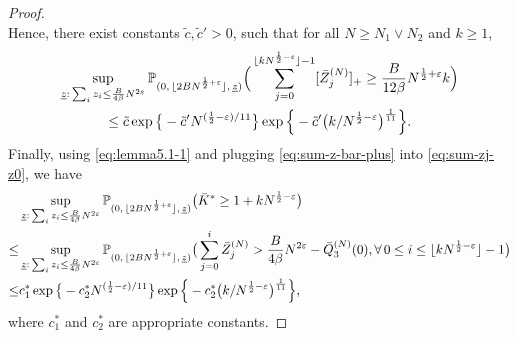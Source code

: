 \documentclass[10pt,a4paper]{amsart}
\begin{document}
\begin{proof}
$$$$
Hence, there exist constants $\tilde{c}, \tilde{c}'>0$, such that for all $N\geq N_1\vee N_2$ and $k\geq 1$,
\begin{multline}\label{eq:sum-z-bar-plus}
    \sup_{\underline{z}: \, \sum_iz_i \leq \frac{B}{4\beta}N^{2\varepsilon}}\mathbb{P}_{(0, \, \lfloor 2BN^{\frac{1}{2}+\varepsilon} \rfloor, \,\underline{z})}\Big(\sum_{j=0}^{\lfloor kN^{\frac{1}{2}-\varepsilon}\rfloor-1}[\Bar{Z}^{(N)}_j]_+\geq \frac{B}{12\beta}N^{\frac{1}{2}+\varepsilon}k\Big)\\
    \leq \tilde{c}\exp \big\{-\tilde{c}'N^{(\frac{1}{2}-\varepsilon)/11}\big\}\exp \Big\{-\tilde{c}'\big(k/N^{\frac{1}{2}-\varepsilon}\big)^{\frac{1}{11}}\Big\}.
\end{multline}
Finally, using \eqref{eq:lemma5.1-1} and plugging \eqref{eq:sum-z-bar-plus} into \eqref{eq:sum-zj-z0}, we have 
\begin{align*}
    &\sup_{\underline{z}: \, \sum_iz_i \leq \frac{B}{4\beta}N^{2\varepsilon}}\mathbb{P}_{(0, \, \lfloor 2BN^{\frac{1}{2}+\varepsilon} \rfloor, \,\underline{z})}\big(\Bar{K}^{*}\geq 1+kN^{\frac{1}{2}-\varepsilon}\big)\nonumber\\
    \leq &  \sup_{\underline{z}: \, \sum_iz_i \leq \frac{B}{4\beta}N^{2\varepsilon}}\mathbb{P}_{(0, \, \lfloor 2BN^{\frac{1}{2}+\varepsilon} \rfloor, \,\underline{z})}\big(\sum_{j=0}^{i}\Bar{Z}^{(N)}_j>\frac{B}{4\beta}N^{2\varepsilon}-\bar{Q}^{(N)}_3(0),\forall \, 0\leq i\leq \lfloor kN^{\frac{1}{2}-\varepsilon}\rfloor -1\big)\\
    \leq & c^*_1\exp \big\{-c^*_2N^{(\frac{1}{2}-\varepsilon)/11}\big\}\exp \Big\{-c^*_2\big(k/N^{\frac{1}{2}-\varepsilon}\big)^{\frac{1}{11}}\Big\},
\end{align*}
where $c^*_1$ and $c^*_2$ are appropriate constants.
\end{proof}
\end{document}
